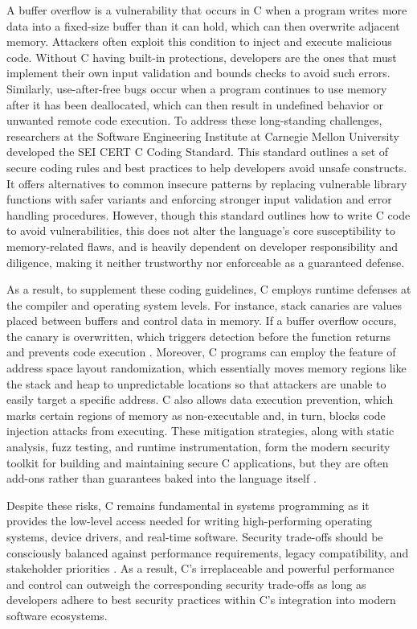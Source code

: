 \documentclass[conference]{IEEEtran}
\begin{document}
A buffer overflow is a vulnerability that occurs in C when a program writes more data into a fixed-size buffer than it can hold, which can then overwrite adjacent memory. Attackers often exploit this condition to inject and execute malicious code. Without C having built-in protections, developers are the ones that must implement their own input validation and bounds checks to avoid such errors. Similarly, use-after-free bugs occur when a program continues to use memory after it has been deallocated, which can then result in undefined behavior or unwanted remote code execution.
To address these long-standing challenges, researchers at the Software Engineering Institute at Carnegie Mellon University developed the SEI CERT C Coding Standard. This standard outlines a set of secure coding rules and best practices to help developers avoid unsafe constructs. It offers alternatives to common insecure patterns by replacing vulnerable library functions with safer variants and enforcing stronger input validation and error handling procedures. However, though this standard outlines how to write C code to avoid vulnerabilities, this does not alter the language’s core susceptibility to memory-related flaws, and is heavily dependent on developer responsibility and diligence, making it neither trustworthy nor enforceable as a guaranteed defense.

As a result, to supplement these coding guidelines, C employs runtime defenses at the compiler and operating system levels. For instance, stack canaries are values placed between buffers and control data in memory. If a buffer overflow occurs, the canary is overwritten, which triggers detection before the function returns and prevents code execution \cite{Ballman2016}. Moreover, C programs can employ the feature of address space layout randomization, which essentially moves memory regions like the stack and heap to unpredictable locations so that attackers are unable to easily target a specific address. C also allows data execution prevention, which marks certain regions of memory as non-executable and, in turn, blocks code injection attacks from executing. These mitigation strategies, along with static analysis, fuzz testing, and runtime instrumentation, form the modern security toolkit for building and maintaining secure C applications, but they are often add-ons rather than guarantees baked into the language itself \cite{Shahriar2012}.

Despite these risks, C remains fundamental in systems programming as it provides the low-level access needed for writing high-performing operating systems, device drivers, and real-time software. Security trade-offs should be consciously balanced against performance requirements, legacy compatibility, and stakeholder priorities \cite{Elahi2007}. As a result, C's irreplaceable and powerful performance and control can outweigh the corresponding security trade-offs as long as developers adhere to best security practices within C's integration into modern software ecosystems.
\end{document}
